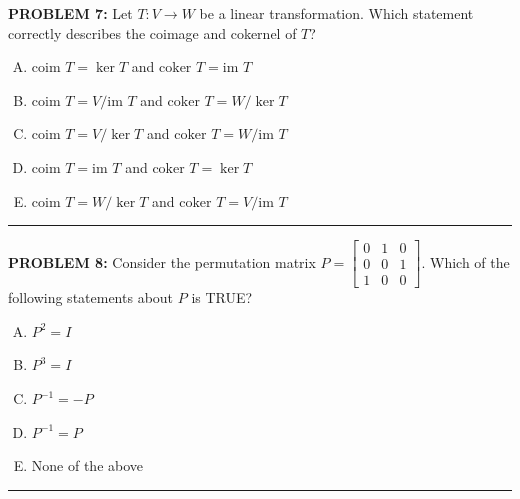 \documentclass[12pt]{amsart}
\newcommand{\divider}{
  \vspace{-1em} %
  \noindent
  \raisebox{-0.15ex}{\textbullet}%
  \hspace{0.5em}%
  \rule[0.5ex]{0.95\textwidth}{1.0pt}%
  \hspace{0.5em}%
  \raisebox{-0.15ex}{\textbullet}%
  \vspace{0em} %
}
\begin{document}
{\bf PROBLEM 7:}
Let $T: V \to W$ be a linear transformation. Which statement correctly describes the coimage and cokernel of $T$?

\begin{enumerate}[(A)]
\item $\text{coim } T = \ker T$ and $\text{coker } T = \text{im } T$
\item $\text{coim } T = V/\text{im } T$ and $\text{coker } T = W/\ker T$
\item $\text{coim } T = V/\ker T$ and $\text{coker } T = W/\text{im } T$
\item $\text{coim } T = \text{im } T$ and $\text{coker } T = \ker T$
\item $\text{coim } T = W/\ker T$ and $\text{coker } T = V/\text{im } T$
\end{enumerate}

\divider


{\bf PROBLEM 8:}
Consider the permutation matrix $P = \begin{bmatrix} 0 & 1 & 0 \\ 0 & 0 & 1 \\ 1 & 0 & 0 \end{bmatrix}$. Which of the following statements about $P$ is TRUE?
\begin{enumerate}[(A)]
\item $P^2 = I$ %
\item $P^3 = I$ %
\item $P^{-1} = -P$ %
\item $P^{-1} = P$ %
\item None of the above
\end{enumerate}
\divider
\end{document}
